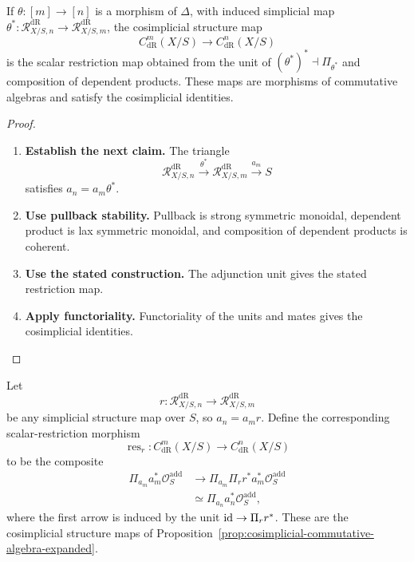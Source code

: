 \begin{proposition}
\label{prop:cosimplicial-commutative-algebra-expanded}
If \(\theta:[m]\to[n]\) is a morphism of \(\Delta\), with induced simplicial map
\(\theta^*:\mathcal R^{\mathrm{dR}}_{X/S,n}\to
\mathcal R^{\mathrm{dR}}_{X/S,m}\), the cosimplicial structure map
\[
  C^m_{\mathrm{dR}}(X/S)
  \longrightarrow
  C^n_{\mathrm{dR}}(X/S)
\]
is the scalar restriction map obtained from the unit of
\((\theta^*)^*\dashv\Pi_{\theta^*}\) and composition of dependent products. These
maps are morphisms of commutative algebras and satisfy the cosimplicial identities.
\end{proposition}

\begin{proof}
\leavevmode
\begin{enumerate}[label=\textup{(\arabic*)}]
    \item \textbf{Establish the next claim.}
    The triangle
    \[
    \mathcal R^{\mathrm{dR}}_{X/S,n}
    \xrightarrow{\theta^*}
    \mathcal R^{\mathrm{dR}}_{X/S,m}
    \xrightarrow{a_m}S
    \]
    satisfies \(a_n=a_m\theta^*\).
    \item \textbf{Use pullback stability.}
    Pullback is strong symmetric monoidal, dependent
    product is lax symmetric monoidal, and composition of dependent products is
    coherent.
    \item \textbf{Use the stated construction.}
    The adjunction unit gives the stated restriction map.
    \item \textbf{Apply functoriality.}
    Functoriality of
    the units and mates gives the cosimplicial identities.
\end{enumerate}
\end{proof}

\begin{construction}
Let
\[
  r:\mathcal R^{\mathrm{dR}}_{X/S,n}\longrightarrow \mathcal R^{\mathrm{dR}}_{X/S,m}
\]
be any simplicial structure map over \(S\), so \(a_n=a_mr\). Define the
corresponding scalar-restriction morphism
\[
  \operatorname{res}_r:
  C^m_{\mathrm{dR}}(X/S)
  \longrightarrow
  C^n_{\mathrm{dR}}(X/S)
\]
to be the composite
\[
\begin{aligned}
  \Pi_{a_m}a_m^*\mathcal O_S^{\mathrm{add}}
  &\longrightarrow
  \Pi_{a_m}\Pi_r r^*a_m^*\mathcal O_S^{\mathrm{add}}\\
  &\simeq
  \Pi_{a_n}a_n^*\mathcal O_S^{\mathrm{add}},
\end{aligned}
\]
where the first arrow is induced by the unit
\(\operatorname{id}\to\Pi_rr^*\). These are the cosimplicial structure maps of
Proposition~\ref{prop:cosimplicial-commutative-algebra-expanded}.
\end{construction}

